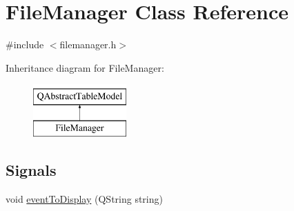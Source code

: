 \hypertarget{class_file_manager}{}\section{File\+Manager Class Reference}
\label{class_file_manager}


{\ttfamily \#include $<$filemanager.\+h$>$}

Inheritance diagram for File\+Manager\+:\begin{figure}[H]
\begin{center}
\leavevmode
\includegraphics[height=2.000000cm]{class_file_manager}
\end{center}
\end{figure}
\subsection*{Signals}
\begin{DoxyCompactItemize}
\item 
void \hyperlink{class_file_manager_a122e43a43028aaa6e1fafe3a2966cc72}{event\+To\+Display} (Q\+String string)
\end{DoxyCompactItemize}
